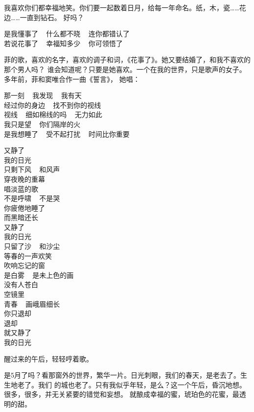 		我喜欢你们都幸福地笑。你们要一起数着日月，给每一年命名。纸，木，瓷……花边……一直到钻石。
	好吗？

		\longpoem{}{}{}
			是我懂事了 ~ 什么都不晓 ~ 连你都错认了 \\
			若说花事了 ~ 幸福知多少 ~ 你可领悟了
		\endlongpoem

		菲的歌，喜欢的名字，喜欢的调子和词，《花事了》。她又要结婚了，和我不喜欢的那个男人吗？
	谁会知道呢？只要是她喜欢。一个在我的世界，只是歌声的女子。多年前，菲和窦唯合作一曲《誓言》，
	她唱：

		\longpoem{}{}{}
			那一刻 ~ 我发现 ~ 我有天 \\
			经过你的身边 ~ 找不到你的视线 \\
			视线 ~ 细如棉线的吗 ~ 无力如此 \\
			我只是望 ~ 你们隔岸的火 \\
			是我想睡了 ~ 受不起打扰 ~ 时间比你重要
		\endlongpoem

	\endwriting


	\longpoem{}{}{}

		又静了 \\
		我的日光 \\
		只剩下风 ~ 和风声 \\
		穿夜晚的重幕 \\
		唱淡蓝的歌 \\
		不是呼啸 ~ 不是哭 \\
		你疲倦地睡了 \\
		而黑暗还长 \\
		又静了 \\
		我的日光 \\
		只留了沙 ~ 和沙尘 \\
		等春的一声欢笑 \\
		吹响忘记的窗 \\
		是白雾 ~ 是未上色的画 \\
		没有人苍白 \\
		空镜里 \\
		青春 ~ 画峨眉细长 \\
		你只退却 \\
		退却 \\
		就又静了 \\
		我的日光

	\endlongpoem
	\endwriting



		醒过来的午后，轻轻哼着歌。

		是5月了吗？看那窗外的世界，繁华一片。日光刺眼，我们的春天，是老去了。生生地老了。我们
	的城也老了。只有我似乎年轻，是么？这一个午后，昏沉地想。很多，很多，并无关紧要的错觉和妄想。
	就酿成幸福的蜜，琥珀色的花蜜，最透明的甜。

